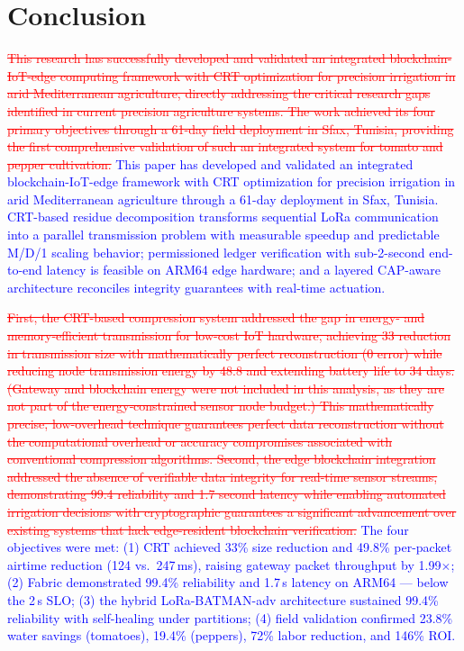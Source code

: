 \documentclass[pdflatex,sn-mathphys-num]{sn-jnl}
\theoremstyle{thmstyleone}
\theoremstyle{thmstyletwo}
\theoremstyle{thmstylethree}
\begin{document}
{\section{Conclusion}
\label{sec:conclusion}

\textcolor{red}{\sout{This research has successfully developed and validated an integrated blockchain-IoT-edge computing framework with CRT optimization for precision irrigation in arid Mediterranean agriculture, directly addressing the critical research gaps identified in current precision agriculture systems. The work achieved its four primary objectives through a 61-day field deployment in Sfax, Tunisia, providing the first comprehensive validation of such an integrated system for tomato and pepper cultivation.}}
\textcolor{blue}{This paper has developed and validated an integrated blockchain-IoT-edge framework with CRT optimization for precision irrigation in arid Mediterranean agriculture through a 61-day deployment in Sfax, Tunisia. CRT-based residue decomposition transforms sequential LoRa communication into a parallel transmission problem with measurable speedup and predictable M/D/1 scaling behavior; permissioned ledger verification with sub-2-second end-to-end latency is feasible on ARM64 edge hardware; and a layered CAP-aware architecture reconciles integrity guarantees with real-time actuation.}

\textcolor{red}{\sout{First, the CRT-based compression system addressed the gap in energy- and memory-efficient transmission for low-cost IoT hardware, achieving 33 reduction in transmission size with mathematically perfect reconstruction (0 error) while reducing node transmission energy by 48.8 and extending battery life to 34 days. (Gateway and blockchain energy were not included in this analysis, as they are not part of the energy‑constrained sensor node budget.) This mathematically precise, low-overhead technique guarantees perfect data reconstruction without the computational overhead or accuracy compromises associated with conventional compression algorithms. Second, the edge blockchain integration addressed the absence of verifiable data integrity for real-time sensor streams, demonstrating 99.4 reliability and 1.7 second latency while enabling automated irrigation decisions with cryptographic guarantees a significant advancement over existing systems that lack edge-resident blockchain verification.}}
\textcolor{blue}{The four objectives were met: (1) CRT achieved 33\% size reduction and 49.8\% per-packet airtime reduction (124 vs.\ 247\,ms), raising gateway packet throughput by 1.99$\times$; (2) Fabric demonstrated 99.4\% reliability and 1.7\,s latency on ARM64 — below the 2\,s SLO; (3) the hybrid LoRa-BATMAN-adv architecture sustained 99.4\% reliability with self-healing under partitions; (4) field validation confirmed 23.8\% water savings (tomatoes), 19.4\% (peppers), 72\% labor reduction, and 146\% ROI.}

}
\end{document}
